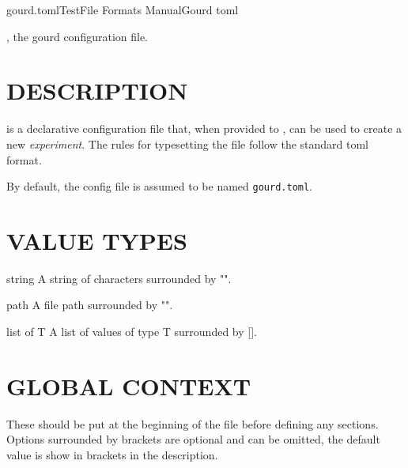 \documentclass[a4paper,english]{article}
\begin{document}
  \pagestyle{fancy}

  \begin{Name}{5}{gourd.toml}{Test}{File Formats Manual}{Gourd toml}
\begin{adjustwidth}{18pt}{0pt}

      , the gourd configuration file.

\end{adjustwidth}
  \end{Name}

\begin{adjustwidth}{18pt}{0pt}

  \section{DESCRIPTION}

      \noindent {} is a declarative configuration file that, when provided to , can be used to create a new \emph{experiment}.
      The rules for typesetting the file follow the standard toml format.

      \begin{Description}[Files]\setlength{\itemsep}{0cm}
          \item[\File{gourd.toml}] By default, the config file is assumed to be named \texttt{gourd.toml}.
      \end{Description}

  \section{VALUE TYPES}

    \begin{Description}[Types]\setlength{\itemsep}{0cm}
        \item[string] A string of characters surrounded by "".
        \item[path] A file path surrounded by "".
        \item[list of T] A list of values of type T surrounded by [].
    \end{Description}

  \section{GLOBAL CONTEXT}

    These should be put at the beginning of the file before defining any sections.
    Options surrounded by brackets are optional and can be omitted, the default value is show in brackets in the description.


\end{adjustwidth}
\end{document}
